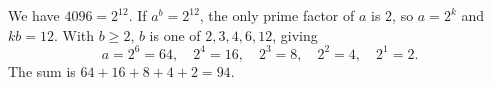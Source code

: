 We have $4096=2^{12}$. If $a^b=2^{12}$, the only prime factor of $a$ is $2$, so $a=2^k$ and $kb=12$. With $b\ge2$, $b$ is one of $2,3,4,6,12$, giving
\[
a=2^6=64,\quad 2^4=16,\quad 2^3=8,\quad 2^2=4,\quad 2^1=2 .
\]
The sum is $64+16+8+4+2=\boxed{94}$.
